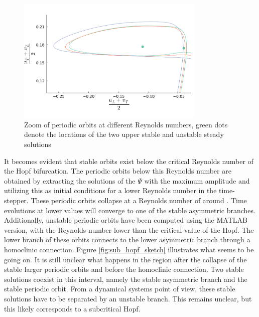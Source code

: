 \begin{figure}[ht]
  \centering
  \includegraphics[width=0.8\textwidth]{figs/orbits_zoom64x64.pdf}
  \caption{Zoom of periodic orbits at different Reynolds numbers, green dots denote
  the locations of the two upper stable and unstable steady solutions}
  \label{fig:orbit}
\end{figure}
It becomes evident that stable orbits exist below the critical Reynolds number
of the Hopf bifurcation. The periodic orbits below this Reynolds number are
obtained by extracting the solutions of the $\Psi$ with the maximum amplitude
and utilizing this as initial conditions for a lower Reynolds number in the
time-stepper. These periodic orbits collapse at a Reynolds number of around
. Time evolutions at lower values will converge to one of the stable
asymmetric branches. Additionally, unstable periodic orbits have been computed
using the MATLAB version, with the Reynolds number lower than the critical
value of the Hopf. The lower branch of these orbits connects to the lower
asymmetric branch through a homoclinic connection. Figure
\ref{fig:sub_hopf_sketch} illustrates what seems to be going on. It is still
unclear what happens in the region after the collapse of the stable larger
periodic orbits and before the homoclinic connection. Two stable solutions
coexist in this interval, namely the stable asymmetric branch and the stable
periodic orbit. From a dynamical systems point of view, these stable solutions
have to be separated by an unstable branch. This remains unclear, but this
likely corresponds to a subcritical Hopf.

